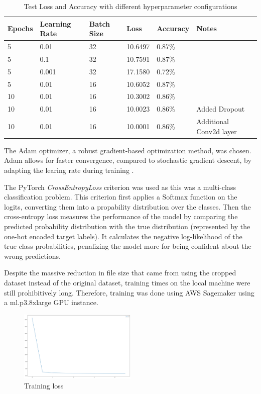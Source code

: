 \documentclass{article}
\begin{document}
\begin{table}[ht]
\centering
\begin{tabularx}{\textwidth}{|X|X|X|X|X|X|}
\hline
\textbf{Epochs} & \textbf{Learning Rate} & \textbf{Batch Size} & \textbf{Loss} & \textbf{Accuracy} & \textbf{Notes} \\
\hline
5 & 0.01 & 32 & 10.6497 & 0.87\% & \\
\hline
5 & 0.1 & 32 & 10.7591 & 0.87\% &  \\
\hline
5 & 0.001 & 32 & 17.1580 & 0.72\% & \\
\hline
5 & 0.01 & 16 & 10.6052 & 0.87\% & \\
\hline
10 & 0.01 & 16 & 10.3002 & 0.86\% & \\
\hline
10 & 0.01 & 16 & 10.0023 & 0.86\% & Added Dropout \\
\hline
10 & 0.01 & 16 & 10.0001 & 0.86\% & Additional Conv2d layer \\
\hline
\end{tabularx}
\caption{Test Loss and Accuracy with different hyperparameter configurations}
\label{tab:example}
\end{table}

The Adam optimizer, a robust gradient-based optimization method, was chosen. Adam allows for faster convergence, compared to stochastic gradient descent, by adapting the learing rate during training \cite{kingma2017adam}.

The PyTorch \emph{CrossEntropyLoss} criterion \cite{cross_entropy_loss} was used as this was a multi-class classification problem. This criterion first applies a Softmax function on the logits, converting them into a propability distribution over the classes. Then the cross-entropy loss measures the performance of the model by comparing the predicted probability distribution with the true distribution (represented by the one-hot encoded target labels). It calculates the negative log-likelihood of the true class probabilities, penalizing the model more for being confident about the wrong predictions.

Despite the massive reduction in file size that came from using the cropped dataset instead of the original dataset, training times on the local machine were still prohibitively long. Therefore, training was done using AWS Sagemaker using a ml.p3.8xlarge GPU instance.

\begin{figure}
    \centering
    \includegraphics[width=0.5\textwidth]{train_loss.png}
    \caption{Training loss}
    \label{fig:training_loss}
\end{figure}
\end{document}
